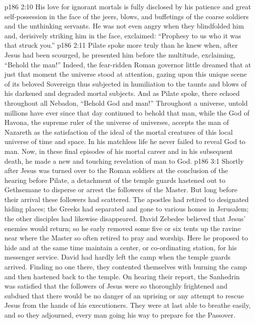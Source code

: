 \vs p186 2:10 His love for ignorant mortals is fully disclosed by his patience and great self\hyp{}possession in the face of the jeers, blows, and buffetings of the coarse soldiers and the unthinking servants. He was not even angry when they blindfolded him and, derisively striking him in the face, exclaimed: “Prophesy to us who it was that struck you.”\plusone
\vs p186 2:11 Pilate spoke more truly than he knew when, after Jesus had been scourged, he presented him before the multitude, exclaiming, “Behold the man!” Indeed, the fear\hyp{}ridden Roman governor little dreamed that at just that moment the universe stood at attention, gazing upon this unique scene of its beloved Sovereign thus subjected in humiliation to the taunts and blows of his darkened and degraded mortal subjects. And as Pilate spoke, there echoed throughout all Nebadon, “Behold God and man!” Throughout a universe, untold millions have ever since that day continued to behold that man, while the God of Havona, the supreme ruler of the universe of universes, accepts the man of Nazareth as the satisfaction of the ideal of the mortal creatures of this local universe of time and space. In his matchless life he never failed to reveal God to man. Now, in these final episodes of his mortal career and in his subsequent death, he made a new and touching revelation of man to God.
%
\vs p186 3:1 Shortly after Jesus was turned over to the Roman soldiers at the conclusion of the hearing before Pilate, a detachment of the temple guards hastened out to Gethsemane to disperse or arrest the followers of the Master. But long before their arrival these followers had scattered. The apostles had retired to designated hiding places; the Greeks had separated and gone to various homes in Jerusalem; the other disciples had likewise disappeared. David Zebedee believed that Jesus’ enemies would return; so he early removed some five or six tents up the ravine near where the Master so often retired to pray and worship. Here he proposed to hide and at the same time maintain a center, or co\hyp{}ordinating station, for his messenger service. David had hardly left the camp when the temple guards arrived. Finding no one there, they contented themselves with burning the camp and then hastened back to the temple. On hearing their report, the Sanhedrin was satisfied that the followers of Jesus were so thoroughly frightened and subdued that there would be no danger of an uprising or any attempt to rescue Jesus from the hands of his executioners. They were at last able to breathe easily, and so they adjourned, every man going his way to prepare for the Passover.
